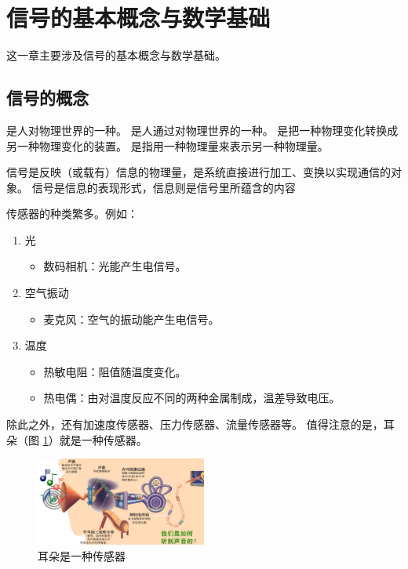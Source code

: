 \section{信号的基本概念与数学基础}

这一章主要涉及信号的基本概念与数学基础。

\subsection{信号的概念}

\begin{definition}[信号]
    是人对物理世界的一种。
    是人通过对物理世界的一种。
    是把一种物理变化转换成另一种物理变化的装置。
    是指用一种物理量来表示另一种物理量。

    信号是反映（或载有）信息的物理量，是系统直接进行加工、变换以实现通信的对象。
    信号是信息的表现形式，信息则是信号里所蕴含的内容
\end{definition}

\begin{example}[传感器]
    传感器的种类繁多。例如：
    \begin{enumerate}
        \item 光
            \begin{itemize}
                \item 数码相机：光能产生电信号。
            \end{itemize}
        \item 空气振动
            \begin{itemize}
                \item 麦克风：空气的振动能产生电信号。
            \end{itemize}
        \item 温度
            \begin{itemize}
                \item 热敏电阻：阻值随温度变化。
                \item 热电偶：由对温度反应不同的两种金属制成，温差导致电压。
            \end{itemize}
    \end{enumerate}

    除此之外，还有加速度传感器、压力传感器、流量传感器等。
    值得注意的是，耳朵（图 \ref{fig:ear}）就是一种传感器。
    \begin{figure}[H]
        \centering
        \includegraphics[width=0.5\textwidth]{chap1/img/ear.png}
        \caption{耳朵是一种传感器}
        \label{fig:ear}
    \end{figure}
\end{example}

